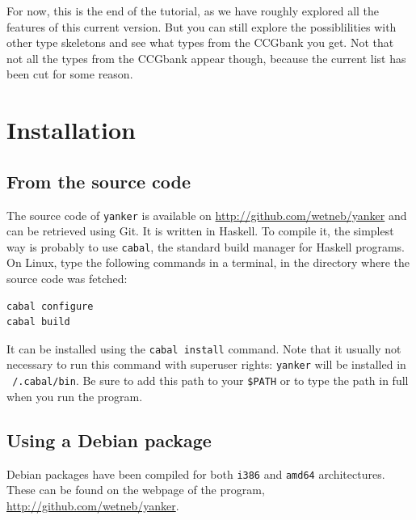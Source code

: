 \documentclass[a4paper]{article}
\begin{document}
For now, this is the end of the tutorial, as we have roughly explored all the
features of this current version. But you can still explore the possiblilities with
other type skeletons and see what types from the CCGbank you get. Not that not all 
the types from the CCGbank appear though, because the current list has been cut for some
reason.

\appendix

\section{Installation}

\subsection{From the source code}
The source code of \texttt{yanker} is available on \url{http://github.com/wetneb/yanker}
and can be retrieved using Git.
It is written in Haskell.
To compile it, the simplest way is probably to use \texttt{cabal}, the standard
build manager for Haskell programs. On Linux, type the following commands in a terminal,
in the directory where the source code was fetched:
\begin{verbatim}
cabal configure
cabal build
\end{verbatim}
It can be installed using the \texttt{cabal install} command. Note that it usually
not necessary to run this command with superuser rights: \texttt{yanker} will be
installed in \texttt{~/.cabal/bin}. Be sure to add this path to your \texttt{\$PATH}
or to type the path in full when you run the program.

\subsection{Using a Debian package}

Debian packages have been compiled for both \texttt{i386} and \texttt{amd64} architectures.
These can be found on the webpage of the program, \url{http://github.com/wetneb/yanker}.




\end{document}
